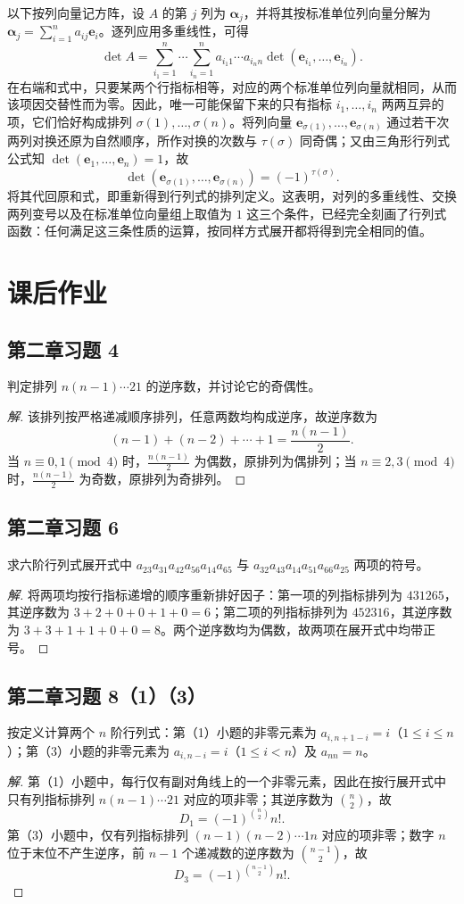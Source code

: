 \documentclass[UTF8, fontset=fandol, a4paper, 12pt]{ctexart}
\theoremstyle{definition}
\begin{document}
以下按列向量记方阵，设 $A$ 的第 $j$ 列为 $\boldsymbol\alpha_j$，并将其按标准单位列向量分解为 $\boldsymbol\alpha_j=\sum_{i=1}^n a_{ij}\boldsymbol e_i$。逐列应用多重线性，可得
\[
 \det A=\sum_{i_1=1}^n\cdots\sum_{i_n=1}^n
 a_{i_1 1}\cdots a_{i_n n}\det(\boldsymbol e_{i_1},\ldots,\boldsymbol e_{i_n}).
\]
在右端和式中，只要某两个行指标相等，对应的两个标准单位列向量就相同，从而该项因交替性而为零。因此，唯一可能保留下来的只有指标 $i_1,\ldots,i_n$ 两两互异的项，它们恰好构成排列 $\sigma(1),\ldots,\sigma(n)$。将列向量 $\boldsymbol e_{\sigma(1)},\ldots,\boldsymbol e_{\sigma(n)}$ 通过若干次两列对换还原为自然顺序，所作对换的次数与 $\tau(\sigma)$ 同奇偶；又由三角形行列式公式知 $\det(\boldsymbol e_1,\ldots,\boldsymbol e_n)=1$，故
\[
 \det(\boldsymbol e_{\sigma(1)},\ldots,\boldsymbol e_{\sigma(n)})
 =(-1)^{\tau(\sigma)}.
\]
将其代回原和式，即重新得到行列式的排列定义。这表明，对列的多重线性、交换两列变号以及在标准单位向量组上取值为 $1$ 这三个条件，已经完全刻画了行列式函数：任何满足这三条性质的运算，按同样方式展开都将得到完全相同的值。

\section{课后作业}

\subsection*{第二章习题 4}
判定排列 $n(n-1)\cdots21$ 的逆序数，并讨论它的奇偶性。
\begin{proof}[解]
该排列按严格递减顺序排列，任意两数均构成逆序，故逆序数为
\[
  (n-1)+(n-2)+\cdots+1=\frac{n(n-1)}2.
\]
当 $n\equiv0,1\pmod4$ 时，$\frac{n(n-1)}{2}$ 为偶数，原排列为偶排列；当 $n\equiv2,3\pmod4$ 时，$\frac{n(n-1)}{2}$ 为奇数，原排列为奇排列。
\end{proof}

\subsection*{第二章习题 6}
求六阶行列式展开式中
$a_{23}a_{31}a_{42}a_{56}a_{14}a_{65}$ 与
$a_{32}a_{43}a_{14}a_{51}a_{66}a_{25}$ 两项的符号。
\begin{proof}[解]
将两项均按行指标递增的顺序重新排好因子：第一项的列指标排列为 $431265$，其逆序数为 $3+2+0+0+1+0=6$；第二项的列指标排列为 $452316$，其逆序数为 $3+3+1+1+0+0=8$。两个逆序数均为偶数，故两项在展开式中均带正号。
\end{proof}

\subsection*{第二章习题 8（1）（3）}
按定义计算两个 $n$ 阶行列式：第（1）小题的非零元素为
$a_{i,n+1-i}=i$（$1\le i\le n$）；第（3）小题的非零元素为
$a_{i,n-i}=i$（$1\le i<n$）及 $a_{nn}=n$。
\begin{proof}[解]
第（1）小题中，每行仅有副对角线上的一个非零元素，因此在按行展开式中只有列指标排列 $n(n-1)\cdots21$ 对应的项非零；其逆序数为 $\binom n2$，故
\[
  D_1=(-1)^{\binom n2}n!.
\]
第（3）小题中，仅有列指标排列 $(n-1)(n-2)\cdots1n$ 对应的项非零；数字 $n$ 位于末位不产生逆序，前 $n-1$ 个递减数的逆序数为 $\binom{n-1}{2}$，故
\[
  D_3=(-1)^{\binom{n-1}{2}}n!.
\]
\end{proof}
\end{document}
